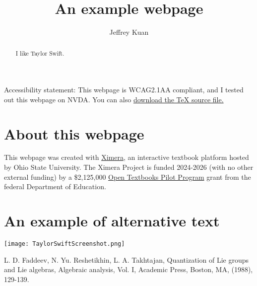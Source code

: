 \documentclass{ximera}
\author{Jeffrey Kuan}
\title{An example webpage}
\begin{document}
\begin{abstract}
   I like Taylor Swift.
\end{abstract}
\maketitle


Accessibility statement: This webpage is WCAG2.1AA compliant, and I tested out this webpage on NVDA. 
You can also \href{https://ximera.osu.edu/firststeps24html/aFirstStepInXimera/basics/MAA_AMS_Example.tex}{download the TeX source file.}

\section{About this webpage}
This webpage was created with \href{https://ximera.osu.edu/}{Ximera}, an 
interactive textbook platform hosted by Ohio State University. The Ximera Project is funded 2024-2026 (with no other external funding) by a 
\$2,125,000 \href{https://www.ed.gov/grants-and-programs/grants-higher-education/improvement-postsecondary-education/open-textbooks-pilot-program}{Open Textbooks Pilot Program} grant from the federal Department of Education.



\section{An example of alternative text}

\texttt{[image: TaylorSwiftScreenshot.png]}




\begin{thebibliography}{10}

 L. D. Faddeev, N. Yu. Reshetikhin, L. A. Takhtajan, Quantization
of Lie groups and Lie algebras, Algebraic analysis, Vol. I, Academic
Press, Boston, MA, (1988), 129-139.

\end{thebibliography}
\end{document}
